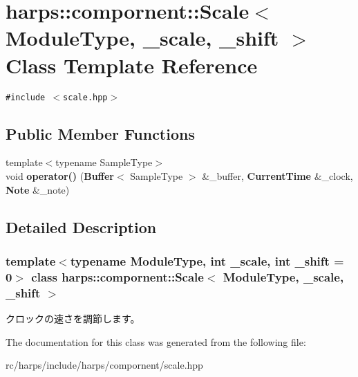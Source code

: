 \section{harps::compornent::Scale$<$ ModuleType, \_\-scale, \_\-shift $>$ Class Template Reference}
\label{classharps_1_1compornent_1_1Scale}
{\tt \#include $<$scale.hpp$>$}

\subsection*{Public Member Functions}
\begin{CompactItemize}
\item 
{\footnotesize template$<$typename SampleType$>$ }\\void \textbf{operator()} ({\bf Buffer}$<$ SampleType $>$ \&\_\-buffer, {\bf CurrentTime} \&\_\-clock, {\bf Note} \&\_\-note)\label{classharps_1_1compornent_1_1Scale_8a7d50f85ca482a39fb3920eece71e29}

\end{CompactItemize}


\subsection{Detailed Description}
\subsubsection*{template$<$typename ModuleType, int \_\-scale, int \_\-shift = 0$>$ class harps::compornent::Scale$<$ ModuleType, \_\-scale, \_\-shift $>$}

クロックの速さを調節します。 

The documentation for this class was generated from the following file:\begin{CompactItemize}
\item 
rc/harps/include/harps/compornent/scale.hpp\end{CompactItemize}
